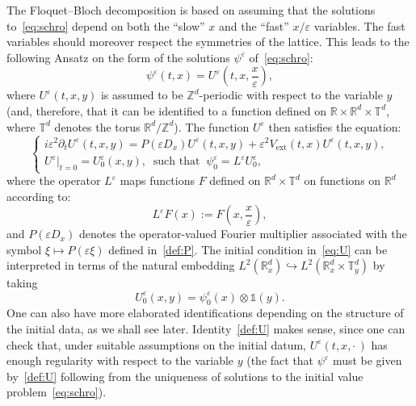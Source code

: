 \documentclass[10pt]{amsart}
\theoremstyle{definition}
\DeclareMathOperator{\ext}{ext}
\newcommand*\R{{\mathbb R}}
\newcommand*\Z{{\mathbb Z}}
\newcommand*\T{{\mathbb T}}
\newcommand*\eps{\varepsilon}
\numberwithin{equation}{section}
\begin{document}
The Floquet--Bloch decomposition is based on assuming that the solutions to~\eqref{eq:schro} depend on both the ``slow'' $x$ and the ``fast'' $x/\eps$ variables. The fast variables should moreover respect the symmetries of the lattice. This leads to the following Ansatz on the form of the solutions $\psi^\eps$ of~\eqref{eq:schro}:
\begin{equation}\label{def:U}
\psi^\eps(t,x)=U^\eps\left(t,x,\frac{x}{\eps}\right),
\end{equation}
where $U^\eps(t,x,y)$ is assumed to be $\Z^d$-periodic with respect to the variable $y$ (and, therefore, that it can be identified to a function defined on $\R\times\R^d\times\T^d$, where $\T^d$ denotes the torus $\R^d \slash \mathbb{Z}^d$). The function $U^\eps$ then satisfies the equation:
\begin{equation}\label{eq:U}
\begin{cases}
i\eps^2\partial_tU^\eps (t,x,y)= P(\eps D_x) U^\eps (t,x,y) +\eps^2 V_{\ext}(t,x) U^\eps(t,x,y),\\
U^\eps|_{t=0}= U^\eps_0(x,y), \;\;\text{such that}\;\;\psi_{0}^{\eps}=L^\eps U^\eps_0,
\end{cases}
\end{equation}
where the operator $L^\eps$ maps functions $F$ defined on $\R^d\times \T^d$ on functions on $\R^d$ according to:
\begin{equation}\label{def:Leps}
L^\eps F(x):=F\left(x,\frac{x}{\eps}\right),
\end{equation}
and $P(\eps D_x)$ denotes the operator-valued Fourier multiplier associated with the symbol $\xi\mapsto P(\eps \xi)$ defined in~\eqref{def:P}. The initial condition in~\eqref{eq:U} can be interpreted in terms of the natural embedding $L^2(\R^d_x)\hookrightarrow L^2(\R^d_x\times \T^d_y)$ by taking
\[
U^\eps_0(x,y) = \psi^\eps_0(x) \otimes \mathds{1}(y).
\]
One can also have more elaborated identifications depending on the structure of the initial data, as we shall see later.
Identity~\eqref{def:U} makes sense, since one can check that, under suitable assumptions on the initial datum, $U^\eps(t,x,\cdot\,)$ has enough regularity with respect to the variable $y$ (the fact that $\psi^\eps$ must be given by~\eqref{def:U} following from the uniqueness of solutions to the initial value problem~\eqref{eq:schro}).


\end{document}
